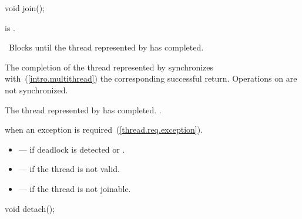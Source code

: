 \begin{itemdescr}
\pnum
\returns {}
\end{itemdescr}

%
%
\begin{itemdecl}
void join();
\end{itemdecl}

\begin{itemdescr}
\pnum
\precondition {} is .

\pnum
\effects\ Blocks until the thread represented by  has completed.

\pnum
\sync The completion of the thread represented by  synchronizes with~(\ref{intro.multithread})
the corresponding successful
 return. \enternote Operations on
 are not synchronized. \exitnote

\pnum
\postconditions The thread represented by  has completed. .

\pnum
\throws {} when
an exception is required~(\ref{thread.req.exception}).

\pnum
\errors
\begin{itemize}
\item {} --- if deadlock is detected or
.

\item {} --- if the thread is not valid.

\item {} --- if the thread is not joinable.
\end{itemize}
\end{itemdescr}

%
%
\begin{itemdecl}
void detach();
\end{itemdecl}


